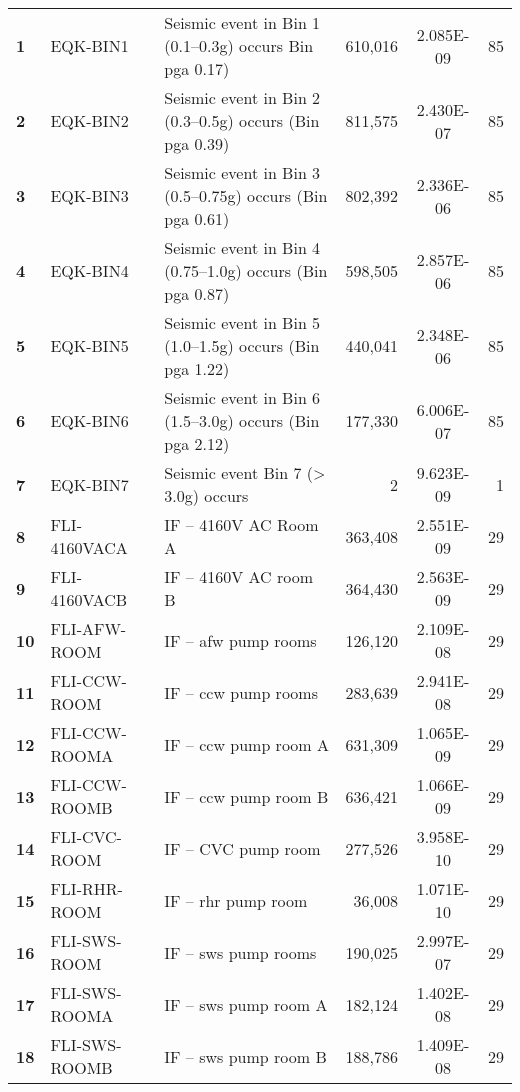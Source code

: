 \begin{longtable}{@{}lllrSr@{}}
\textbf{1}  & EQK-BIN1         & Seismic event in Bin 1 (0.1--0.3g) occurs Bin \acrshort{pga} 0.17) & 610,016   & 2.085E-09 & 85 \\
\textbf{2}  & EQK-BIN2         & Seismic event in Bin 2 (0.3--0.5g) occurs (Bin \acrshort{pga} 0.39) & 811,575   & 2.430E-07 & 85 \\
\textbf{3}  & EQK-BIN3         & Seismic event in Bin 3 (0.5--0.75g) occurs (Bin \acrshort{pga} 0.61) & 802,392   & 2.336E-06 & 85 \\
\textbf{4}  & EQK-BIN4         & Seismic event in Bin 4 (0.75--1.0g) occurs (Bin \acrshort{pga} 0.87) & 598,505   & 2.857E-06 & 85 \\
\textbf{5}  & EQK-BIN5         & Seismic event in Bin 5 (1.0--1.5g) occurs (Bin \acrshort{pga} 1.22) & 440,041   & 2.348E-06 & 85 \\
\textbf{6}  & EQK-BIN6         & Seismic event in Bin 6 (1.5--3.0g) occurs (Bin \acrshort{pga} 2.12) & 177,330   & 6.006E-07 & 85 \\
\textbf{7}  & EQK-BIN7         & Seismic event Bin 7 (> 3.0g) occurs & 2         & 9.623E-09 & 1  \\
\textbf{8}  & FLI-4160VACA     & IF -- 4160V AC Room A & 363,408   & 2.551E-09 & 29 \\
\textbf{9}  & FLI-4160VACB     & IF -- 4160V AC room B & 364,430   & 2.563E-09 & 29 \\
\textbf{10} & FLI-AFW-ROOM     & IF -- \acrshort{afw} pump rooms & 126,120   & 2.109E-08 & 29 \\
\textbf{11} & FLI-CCW-ROOM     & IF -- \acrshort{ccw} pump rooms & 283,639   & 2.941E-08 & 29 \\
\textbf{12} & FLI-CCW-ROOMA    & IF -- \acrshort{ccw} pump room A & 631,309   & 1.065E-09 & 29 \\
\textbf{13} & FLI-CCW-ROOMB    & IF -- \acrshort{ccw} pump room B & 636,421   & 1.066E-09 & 29 \\
\textbf{14} & FLI-CVC-ROOM     & IF -- CVC pump room & 277,526   & 3.958E-10 & 29 \\
\textbf{15} & FLI-RHR-ROOM     & IF -- \acrshort{rhr} pump room & 36,008    & 1.071E-10 & 29 \\
\textbf{16} & FLI-SWS-ROOM     & IF -- \acrshort{sws} pump rooms & 190,025   & 2.997E-07 & 29 \\
\textbf{17} & FLI-SWS-ROOMA    & IF -- \acrshort{sws} pump room A & 182,124   & 1.402E-08 & 29 \\
\textbf{18} & FLI-SWS-ROOMB    & IF -- \acrshort{sws} pump room B & 188,786   & 1.409E-08 & 29 \\

\end{longtable}
